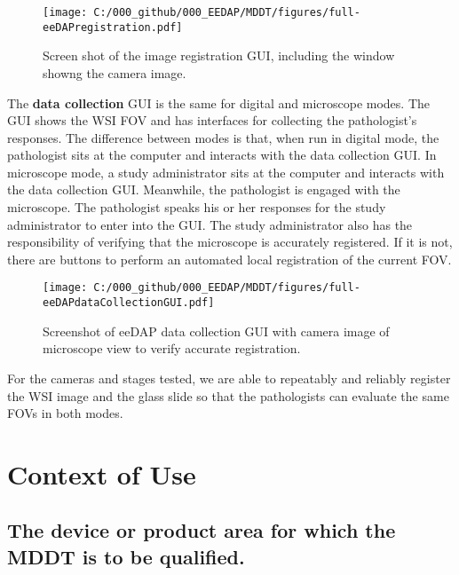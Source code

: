 \documentclass{article}%
\begin{document}
\begin{figure}[ptbh]
\label{fig_full-eeDAPregistration}
\texttt{[image: C:/000\_github/000\_EEDAP/MDDT/figures/full-eeDAPregistration.pdf]}
\caption{Screen shot of the image registration GUI, including the window
showng the camera image.}%
\end{figure}

The \textbf{data collection} GUI is the same for digital and microscope modes.
The GUI shows the WSI FOV and has interfaces for collecting the pathologist's
responses. The difference between modes is that, when run in digital mode, the
pathologist sits at the computer and interacts with the data collection GUI.
In microscope mode, a study administrator sits at the computer and interacts
with the data collection GUI. Meanwhile, the pathologist is engaged with the
microscope. The pathologist speaks his or her responses for the study
administrator to enter into the GUI. The study administrator also has the
responsibility of verifying that the microscope is accurately registered. If
it is not, there are buttons to perform an automated local registration of the
current FOV.

\begin{figure}[ptbh]
\label{fig_full-eeDAPdataCollectionGUI}
\texttt{[image: C:/000\_github/000\_EEDAP/MDDT/figures/full-eeDAPdataCollectionGUI.pdf]}
\caption{Screenshot of eeDAP data collection GUI with camera image of
microscope view to verify accurate registration.}%
\end{figure}

For the cameras and stages tested, we are able to repeatably and reliably
register the WSI image and the glass slide so that the pathologists can
evaluate the same FOVs in both modes.

\section{Context of Use}

\label{context-of-use}

\subsection{The device or product area for which the MDDT is to be qualified.}

\label{the-device-or-product-area-for-which-the-mddt-is-to-be-qualified.}
\end{document}
